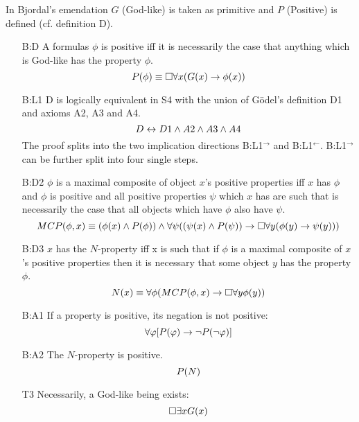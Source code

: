 \documentclass{birkjour}
\theoremstyle{definition}
\theoremstyle{remark}
\numberwithin{equation}{section}
\begin{document}
\begin{appendix}
In Bjordal's emendation $G$ (God-like) is taken as primitive and $P$ (Positive) is defined (cf. definition D).
\begin{itemize}
\item[B:D] A formulas $\phi$ is positive iff it is necessarily the case
  that anything which is God-like has the property $\phi$.
  $$P(\phi) \equiv \Box \forall x (G(x) \rightarrow \phi(x))$$ 
\item[B:L1] D is logically equivalent in S4 with the union of G\"odel's definition D1 and axioms A2, A3 and A4.
  $$D \leftrightarrow D1 \wedge A2 \wedge A3 \wedge A4$$
  The proof splits into the two implication directions B:L1$^\rightarrow$ and B:L1$^\leftarrow$. B:L1$^\rightarrow$ can be further split into four single steps.
\item[B:D2] $\phi$ is a maximal composite of object $x$'s positive properties iff $x$ has $\phi$ and $\phi$ is positive and all positive properties $\psi$ which $x$ has are such that is necessarily the case that all objects which have $\phi$ also have $\psi$.
  $$MCP(\phi,x) \equiv (\phi(x) \wedge P(\phi)) \wedge \forall \psi ((\psi(x) \wedge P(\psi)) \rightarrow \Box \forall y (\phi(y) \rightarrow \psi(y)))$$
\item[B:D3] $x$ has the $N$-property iff x is such that if $\phi$ is a maximal composite of $x$'s positive properties then it is necessary that some object $y$ has the property $\phi$.
  $$N(x) \equiv \forall \phi (MCP(\phi,x) \rightarrow \Box \forall y \phi(y))$$
\item[B:A1] If a property is positive, its negation is not positive:
  $$\forall \varphi [P(\varphi) \rightarrow \neg P(\neg \varphi)]$$ 
\item[B:A2] The $N$-property is positive.
 $$P(N)$$
\item[T3] Necessarily, a God-like being exists: $$\Box \exists x G(x)$$ 
\end{itemize}

\end{appendix}


\end{document}
